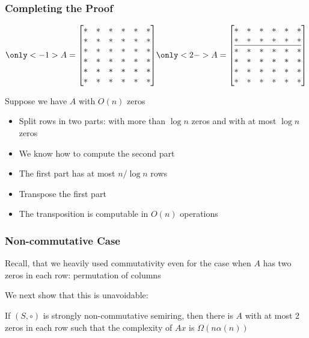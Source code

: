\documentclass{beamer}
\begin{document}
\begin{frame}
\frametitle{Completing the Proof}

\begin{equation*}\only<-1>{A=\left[
\begin{array}{@{}cccccc@{}}
     \ast & \ast  & \ast  & \ast  & \ast  & \ast  \\
     \ast & \ast & \ast  & \ast  & \ast  & \ast  \\
     \ast & \ast & \ast  & \ast  & \ast  & \ast  \\
     \ast & \ast & \ast  & \ast  & \ast  & \ast  \\
     \ast & \ast & \ast  & \ast  & \ast  & \ast  \\
     \ast & \ast & \ast  & \ast  & \ast  & \ast  \\
    \end{array}
    \right]}
\only<2->{
A=\left[
\begin{array}{@{}cccccc@{}}
     \ast & \ast  & \ast  & \ast  & \ast  & \ast  \\
     \ast & \ast & \ast  & \ast  & \ast  & \ast  \\
     \hline
     \ast & \ast & \ast  & \ast  & \ast  & \ast  \\
     \ast & \ast & \ast  & \ast  & \ast  & \ast  \\
     \ast & \ast & \ast  & \ast  & \ast  & \ast  \\
     \ast & \ast & \ast  & \ast  & \ast  & \ast  \\
    \end{array}
    \right]
}
\end{equation*}

Suppose we have $A$ with $O(n)$ zeros

\pause
\begin{itemize}[<+->]
\item Split rows in two parts: with more than $\log n$ zeros and with at most $\log n$ zeros
\item We know how to compute the second part
\item The first part has at most $n/\log n$ rows
\item Transpose the first part
\item The transposition is computable in $O(n)$ operations
\end{itemize}


\end{frame}

\begin{frame}
\frametitle{Non-commutative Case}

Recall, that we heavily used commutativity even for the case when $A$ has two zeros in each row: permutation of columns

\pause
\medskip
We next show that this is unavoidable:

\medskip
\begin{theorem}
If $(S,\circ)$ is strongly non-commutative semiring, then there is $A$ with at most 2 zeros in each row such that the complexity of $Ax$ is $\Omega(n\alpha(n))$
\end{theorem}

\end{frame}
\end{document}
